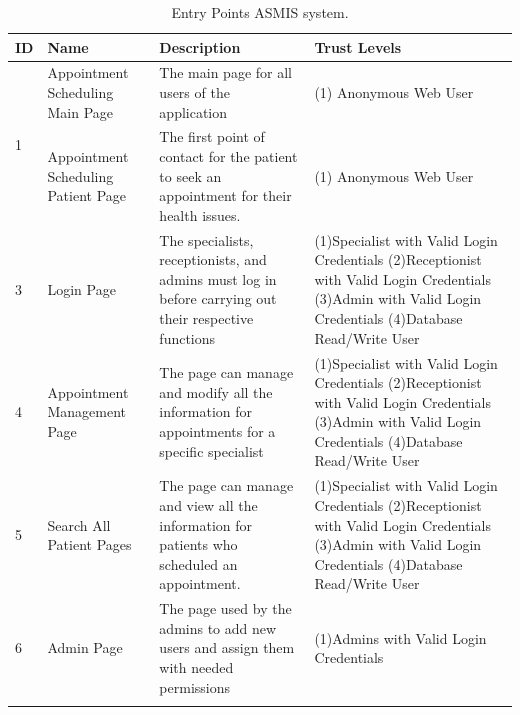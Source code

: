 \begingroup
\centering
\setlength{\tabcolsep}{6.5pt} %
\renewcommand{\arraystretch}{1.8} %
\begin{longtable}{ |p{3cm}|p{3cm}|p{5cm}| p{3cm} |}
 \hline
 \textbf{ID} & \textbf{Name} & \textbf{Description} & \textbf{Trust Levels} \\ [0.5ex] 
 \hline
 \multirow{2}{5em}{1} & Appointment Scheduling Main Page & The main page for all users of the application & (1) Anonymous Web User \\
 \hline
 \multirow{2}{5em}{2} & Appointment Scheduling Patient Page & The first point of contact for the patient to seek an appointment for their health issues. & (1) Anonymous Web User \\
 \hline
 3 & Login Page & The specialists, receptionists, and admins must log in before carrying out their respective functions & 
 (1)Specialist with Valid Login Credentials \newline
 (2)Receptionist with Valid Login Credentials \newline
 (3)Admin with Valid Login Credentials \newline
 (4)Database Read/Write User
 \\
 \hline
 4 & Appointment Management Page & The page can manage and modify all the information for appointments for a specific specialist & 
 (1)Specialist with Valid Login Credentials \newline
 (2)Receptionist with Valid Login Credentials \newline
 (3)Admin with Valid Login Credentials \newline
 (4)Database Read/Write User\\
 \hline
  5 & Search All Patient Pages & The page can manage and view all the information for patients who scheduled an appointment. & 
 (1)Specialist with Valid Login Credentials \newline
 (2)Receptionist with Valid Login Credentials \newline
 (3)Admin with Valid Login Credentials \newline
 (4)Database Read/Write User
 \\
 \hline
 6 & Admin Page & The page used by the admins to add new users and assign them with needed permissions & 
 (1)Admins with Valid Login Credentials \newline \\
 \hline
 \caption{Entry Points ASMIS system.}
    \label{table:entry_points}
\end{longtable}
\endgroup

